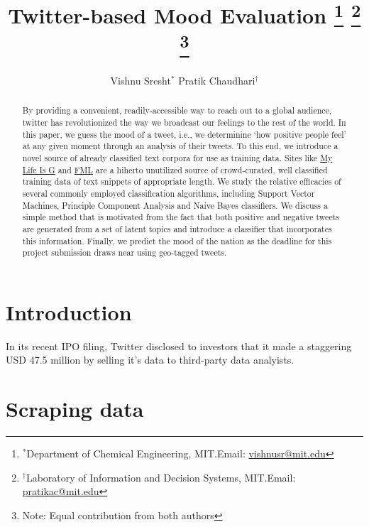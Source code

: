 \documentclass[11pt, letterpaper, conference, final, twocolumn]{ieeeconf}
\begin{document}
\title{\bf Twitter-based Mood Evaluation
	\thanks{$^*$Department of Chemical Engineering, MIT.\newline Email: \href{mailto:vishnusr@mit.edu}{vishnusr@mit.edu}}
	\thanks{$^\dag$Laboratory of Information and Decision Systems, MIT.\newline Email: \href{mailto:pratikac@mit.edu}{pratikac@mit.edu}}
	\thanks{Note: Equal contribution from both authors}
}
\author{Vishnu Sresht$^*$ \qquad Pratik Chaudhari$^\dag$}
\maketitle

\begin{abstract}
By providing a convenient, readily-accessible way to reach out to a global audience, twitter has revolutionized the way we broadcast our feelings to the rest of the world. In this paper, we guess the mood of a tweet, i.e., we determinine `how positive people feel' at any given moment through an analysis of their tweets. To this end, we introduce a novel source of already classified text corpora for use as training data. Sites like \href{http://mylifeisg.com}{My Life Is G} and \href{http://fmylife.com}{FML} are a hiherto unutilized source of crowd-curated, well classified training data of text snippets of appropriate length. We study the relative efficacies of several commonly employed classification algorithms, including Support Vector Machines, Principle Component Analysis and Naive Bayes classifiers. We discuss a simple method that is motivated from the fact that both positive and negative tweets are generated from a set of latent topics and introduce a classifier that incorporates this information. Finally, we predict the mood of the nation as the deadline for this project submission draws near using geo-tagged tweets.
\end{abstract}

\section{Introduction}
\label{sec:intro}
In its recent IPO filing, Twitter disclosed to investors that it made a staggering USD 47.5 million by selling it's data to third-party data analyists. 



\section{Scraping data}
\label{sec:data}
\end{document}
